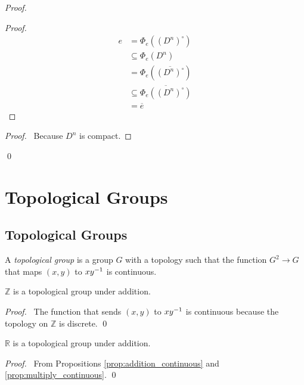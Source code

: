 \begin{proof}
\pf
{}
\begin{proof}
	\pf
	\begin{align*}
	e & = \Phi_e((D^n)^\circ) \\
	& \subseteq \Phi_e(D^n) \\
	& = \Phi_e(\overline{(D^n)^\circ}) \\
	& \subseteq \overline{\Phi_e((D^n)^\circ)} \\
	& = \overline{e}
	\end{align*}
\end{proof}
\begin{proof}
	\pf\ Because $D^n$ is compact.
\end{proof}
\qed
\end{proof}

\chapter{Topological Groups}

\section{Topological Groups}

\begin{df}
A \emph{topological group} is a group $G$ with a topology such that the function $G^2 \rightarrow G$ that maps $(x,y)$ to $x{y}^{-1}$ is continuous.
\end{df}

\begin{ex}
$\mathbb{Z}$ is a topological group under addition.
\end{ex}

\begin{proof}
\pf\ The function that sends $(x,y)$ to $x {y}^{-1}$ is continuous because the topology on $\mathbb{Z}$ is discrete. \qed
\end{proof}

\begin{ex}
$\mathbb{R}$ is a topological group under addition.
\end{ex}

\begin{proof}
\pf\ From Propositions \ref{prop:addition_continuous} and \ref{prop:multiply_continuous}. \qed
\end{proof}

